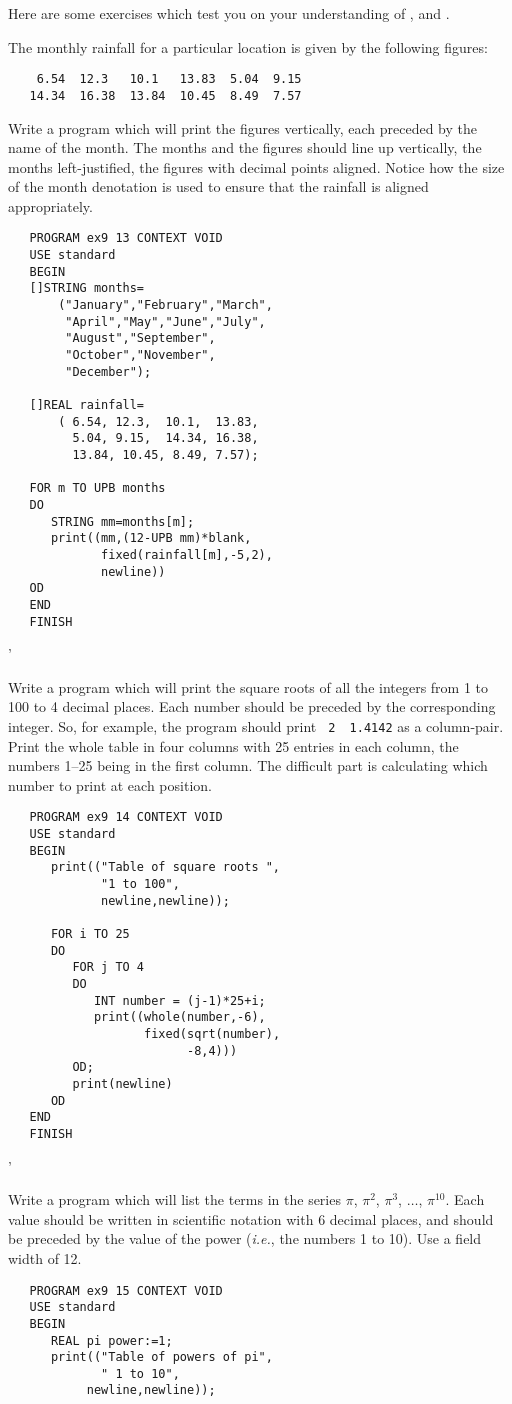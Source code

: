 Here are some exercises which test you on your understanding of
,  and .

\begin{exercise}
\item The monthly rainfall for a particular location is given by the
following figures:
\begin{verbatim}
    6.54  12.3   10.1   13.83  5.04  9.15
   14.34  16.38  13.84  10.45  8.49  7.57
\end{verbatim}
\noindent
Write a program which will print the figures vertically, each preceded
by the name of the month. The months and the figures should line up
vertically, the months left-justified, the figures with decimal points
aligned. \ans Notice how the size of the month denotation is used to
ensure that the rainfall is aligned appropriately.
\begin{verbatim}
   PROGRAM ex9 13 CONTEXT VOID
   USE standard
   BEGIN
   []STRING months=
       ("January","February","March",
        "April","May","June","July",
        "August","September",
        "October","November",
        "December");

   []REAL rainfall=
       ( 6.54, 12.3,  10.1,  13.83,
         5.04, 9.15,  14.34, 16.38,
         13.84, 10.45, 8.49, 7.57);

   FOR m TO UPB months
   DO
      STRING mm=months[m];
      print((mm,(12-UPB mm)*blank,
             fixed(rainfall[m],-5,2),
             newline))
   OD
   END
   FINISH
\end{verbatim}
'
\item Write a program which will print the square roots of all the
integers from 1 to 100 to 4 decimal places. Each number should be
preceded by the corresponding integer. So, for example, the program
should print \verb*| 2  1.4142| as a column-pair. Print the whole table
in four columns with 25 entries in each column, the numbers 1--25 being
in the first column. \ans The difficult part is calculating which
number to print at each position.
\begin{verbatim}
   PROGRAM ex9 14 CONTEXT VOID
   USE standard
   BEGIN
      print(("Table of square roots ",
             "1 to 100",
             newline,newline));

      FOR i TO 25
      DO
         FOR j TO 4
         DO
            INT number = (j-1)*25+i;
            print((whole(number,-6),
                   fixed(sqrt(number),
                         -8,4)))
         OD;
         print(newline)
      OD
   END
   FINISH
\end{verbatim}
'
\item Write a program which will list the terms in the series $\pi$,
$\pi^2$, $\pi^3$, $\ldots$, $\pi^{10}$. Each value should be written in
scientific notation with 6 decimal places, and should be preceded by
the value of the power ({\it i.e.}, the numbers 1 to 10). Use a field
width of 12. \ans \ %
\begin{verbatim}
   PROGRAM ex9 15 CONTEXT VOID
   USE standard
   BEGIN
      REAL pi power:=1;
      print(("Table of powers of pi",
             " 1 to 10",
           newline,newline));


\end{verbatim}
\end{exercise}

